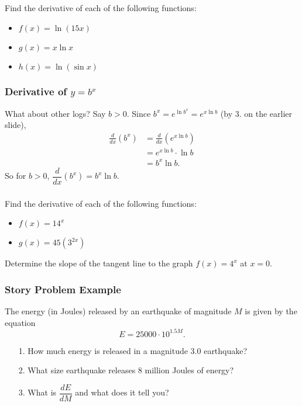 \documentclass[14pt]{beamer}
\begin{document}
\begin{frame}%
\frametitle{}
\begin{exe} Find the derivative of each of the following functions:

\begin{itemize}
\item $f(x)=\ln(15x)$

\vspace{0.75pc}
\item $g(x)=x \ln x$

\vspace{0.75pc}
\item $h(x)=\ln(\sin x)$
\end{itemize}
\end{exe}
\end{frame}

\begin{frame}
\frametitle{Derivative of $y=b^x$}
What about other logs?  Say $b>0$.  Since $b^x=e^{\ln b^x}=e^{x \ln b}$ (by 3. on the earlier slide), 
\begin{align*}
\frac{d}{dx}(b^x) &= \frac{d}{dx}(e^{x \ln b}) \\[0.75pc]
 &=e^{x \ln b} \cdot \ln b \\[0.75pc]
 &= b^x \ln b.
\end{align*}
So for $b>0$, $\dfrac{d}{dx}(b^x)=b^x \ln b$.
\end{frame}

\begin{frame}
\frametitle{}
\begin{exe} Find the derivative of each of the following functions:
\begin{itemize}
\item $f(x)=14^x$

\vspace{0.75pc}
\item $g(x)=45(3^{2x})$
\end{itemize}
\end{exe}

\begin{exe} Determine the slope of the tangent line to the graph $f(x)=4^x$ at $x=0$. \end{exe}
\end{frame}

\begin{frame}%
\frametitle{Story Problem Example}
\small
\begin{exe} The energy (in Joules) released by an earthquake of magnitude $M$ is given by the equation
\[E=25000 \cdot 10^{1.5 M}.\]

\vspace{-1pc}
\begin{itemize}
\item[1.] How much energy is released in a magnitude 3.0 earthquake?
\item[2.] What size earthquake releases 8 million Joules of energy?
\item[3.] What is $\dfrac{dE}{dM}$ and what does it tell you?
\end{itemize}
\end{exe}
\end{frame}
\end{document}
